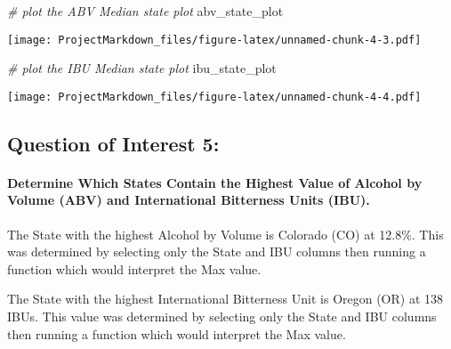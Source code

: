 \documentclass[
]{article}
\newenvironment{Shaded}{\begin{snugshade}}{\end{snugshade}}
\newcommand{\CommentTok}[1]{\textcolor[rgb]{0.56,0.35,0.01}{\textit{#1}}}
\newcommand{\DocumentationTok}[1]{\textcolor[rgb]{0.56,0.35,0.01}{\textbf{\textit{#1}}}}
\newcommand{\FunctionTok}[1]{\textcolor[rgb]{0.00,0.00,0.00}{#1}}
\newcommand{\NormalTok}[1]{#1}
\newcommand{\OtherTok}[1]{\textcolor[rgb]{0.56,0.35,0.01}{#1}}
\newcommand{\SpecialCharTok}[1]{\textcolor[rgb]{0.00,0.00,0.00}{#1}}
\begin{document}
\begin{Shaded}
\begin{Highlighting}[]
\CommentTok{\# plot the ABV Median state plot}
\NormalTok{abv\_state\_plot}
\end{Highlighting}
\end{Shaded}

\texttt{[image: ProjectMarkdown\_files/figure-latex/unnamed-chunk-4-3.pdf]}

\begin{Shaded}
\begin{Highlighting}[]
\CommentTok{\# plot the IBU Median state plot}
\NormalTok{ibu\_state\_plot}
\end{Highlighting}
\end{Shaded}

\texttt{[image: ProjectMarkdown\_files/figure-latex/unnamed-chunk-4-4.pdf]}

\hypertarget{question-of-interest-5}{%
\subsection{Question of Interest 5:}\label{question-of-interest-5}}

\hypertarget{determine-which-states-contain-the-highest-value-of-alcohol-by-volume-abv-and-international-bitterness-units-ibu.}{%
\paragraph{Determine Which States Contain the Highest Value of Alcohol
by Volume (ABV) and International Bitterness Units
(IBU).}\label{determine-which-states-contain-the-highest-value-of-alcohol-by-volume-abv-and-international-bitterness-units-ibu.}}

The State with the highest Alcohol by Volume is Colorado (CO) at 12.8\%.
This was determined by selecting only the State and IBU columns then
running a function which would interpret the Max value.

The State with the highest International Bitterness Unit is Oregon (OR)
at 138 IBUs. This value was determined by selecting only the State and
IBU columns then running a function which would interpret the Max value.

\begin{Shaded}
\end{Shaded}
\end{document}
